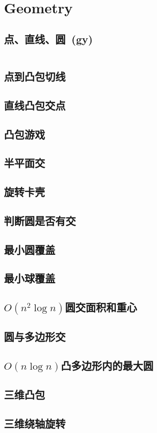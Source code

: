 \chapter{Geometry}
\section{点、直线、圆\ \small(gy)}
	\inputminted{cpp}{Geometry/basic_geometry.cpp}
\section{点到凸包切线}
\section{直线凸包交点}
\section{凸包游戏}
\section{半平面交}
\section{旋转卡壳}
\section{判断圆是否有交}
\section{最小圆覆盖}
\section{最小球覆盖}
\section{$ O(n ^ 2 \log n) $圆交面积和重心}
\section{圆与多边形交}
\section{$ O(n \log n) $凸多边形内的最大圆}
\section{三维凸包}
\section{三维绕轴旋转}